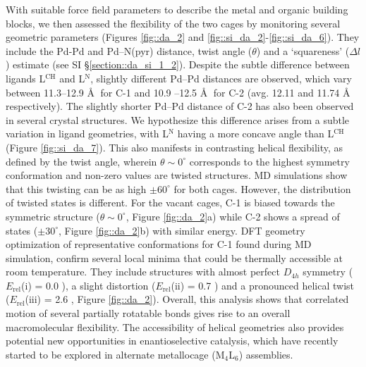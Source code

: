 \documentclass[../../main.tex]{subfiles}
\begin{document}
With suitable force field parameters to describe the metal and organic building blocks, we then assessed the flexibility of the two cages by monitoring several geometric parameters (Figures \ref{fig::da_2} and \ref{fig::si_da_2}-\ref{fig::si_da_6}). They include the Pd-Pd and Pd–N(pyr) distance, twist angle ($\theta$) and a ‘squareness’ ($\Delta l$) estimate (see SI §\ref{section::da_si_1_2}). Despite the subtle difference between ligands L$^\text{CH}$ and L$^\text{N}$, slightly different Pd--Pd distances are observed, which vary between 11.3--12.9 \AA$\;$ for C-1 and 10.9 –12.5 \AA$\;$ for C-2 (avg. 12.11 and 11.74 \AA$\;$ respectively). The slightly shorter Pd--Pd distance of C-2 has also been observed in several crystal structures. We hypothesize this difference arises from a subtle variation in ligand geometries, with L${}^\text{N}$ having a more concave angle than L$^\text{CH}$ (Figure \ref{fig::si_da_7}). This also manifests in contrasting helical flexibility, as defined by the twist angle, wherein $\theta \sim0^\circ$ corresponds to the highest symmetry conformation and non-zero values are twisted structures. MD simulations show that this twisting can be as high $\pm60^\circ$ for both cages. However, the distribution of twisted states is different. For the vacant cages, C-1 is biased towards the symmetric structure ($\theta \sim0^\circ$, Figure \ref{fig::da_2}a) while C-2 shows a spread of states ($\pm30^\circ$, Figure \ref{fig::da_2}b) with similar energy. DFT geometry optimization of representative conformations for C-1 found during MD simulation, confirm several local minima that could be thermally accessible at room temperature. They include structures with almost perfect $D_{4h}$ symmetry ($E_\text{rel}$(i) = 0.0 \kcal), a slight distortion ($E_\text{rel}$(ii) = 0.7 \kcal) and a pronounced helical twist ($E_\text{rel}$(iii) = 2.6 \kcal, Figure \ref{fig::da_2}). Overall, this analysis shows that correlated motion of several partially rotatable bonds gives rise to an overall macromolecular flexibility. The accessibility of helical geometries also provides potential new opportunities in enantioselective catalysis, which have recently started to be explored in alternate metallocage (M$_4$L$_6$) assemblies.\cite{Zhao2013} 
\end{document}
